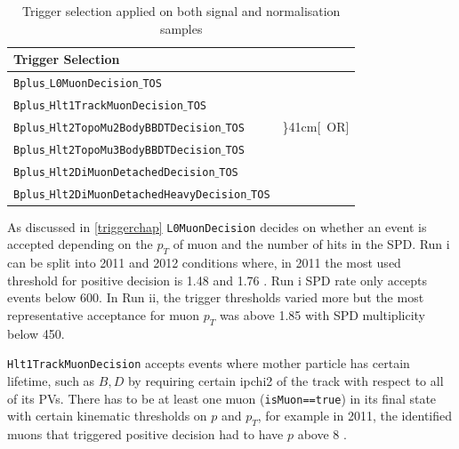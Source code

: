 \begin{table}[h!]
\begin{center}
	\begin{tabular}{ l l}%
Trigger Selection  \\ %
\hline
		\texttt{Bplus$\_$L0MuonDecision$\_$TOS} \\ %
\hline
		\texttt{Bplus$\_$Hlt1TrackMuonDecision$\_$TOS} \\%
\hline
		\texttt{Bplus$\_$Hlt2TopoMu2BodyBBDTDecision$\_$TOS} & \rdelim\}{4}{1cm}[\ OR]\\ %
		\texttt{Bplus$\_$Hlt2TopoMu3BodyBBDTDecision$\_$TOS} \\ %
		\texttt{Bplus$\_$Hlt2DiMuonDetachedDecision$\_$TOS} \\ %
		\texttt{Bplus$\_$Hlt2DiMuonDetachedHeavyDecision$\_$TOS} \\ %
\hline
\end{tabular}
\end{center}
	\caption{Trigger selection applied on both signal and normalisation samples}
	\label{tab:triggersel}
\end{table}

As discussed in \autoref{triggerchap} \texttt{L0MuonDecision} decides on whether an event is accepted depending on the $p_{T}$ of muon and the number of hits in the \gls{SPD}. Run \Rn{1} can be split into 2011 and 2012 conditions where, in 2011 the most used threshold for positive decision is 1.48 \gevc \cite{Aaij:2012me} and 1.76 \gevc \cite{Albrecht:2013fba}. Run \Rn{1} \gls{SPD} rate only accepts events below 600. In Run \Rn{2}, the trigger thresholds varied more but the most representative acceptance for muon $p_{T}$ was above 1.85 \gevc with \gls{SPD} multiplicity below 450.

\texttt{Hlt1TrackMuonDecision} accepts events where mother particle has certain lifetime, such as $B,D$ by requiring certain \gls{ipchi2} of the track with respect to all of its \gls{PV}s. There has to be at least one muon (\texttt{isMuon==true}) in its final state with certain kinematic thresholds on $p$ and $p_{T}$, for example in 2011, the identified muons that triggered positive decision had to have $p$ above 8 \gevc \cite{Aaij:2012me}.

